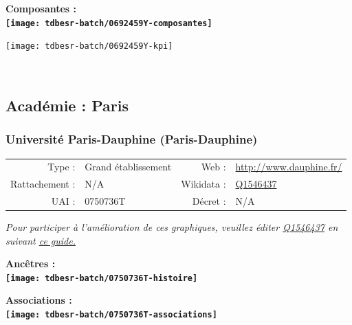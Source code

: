 \documentclass[12pt,french,]{article}
\begin{document}
\hrulefill

\begin{center} \bf Composantes : \\  
\texttt{[image: tdbesr-batch/0692459Y-composantes]} \end{center}

\begin{center}\texttt{[image: tdbesr-batch/0692459Y-kpi]} \end{center}\checkoddpage

\ifoddpage \fi ~\newpage  

\hypertarget{acaduxe9mie-paris-1}{%
\subsection{Académie : Paris}\label{acaduxe9mie-paris-1}}

\hypertarget{universituxe9-paris-dauphine-paris-dauphine}{%
\subsubsection{Université Paris-Dauphine
(Paris-Dauphine)}\label{universituxe9-paris-dauphine-paris-dauphine}}

\begin{tabular*}{\textwidth}{rp{5cm}rl}  
\hline  
Type : & Grand établissement & Web : &\href{http://www.dauphine.fr/}{http://www.dauphine.fr/} \\  
Rattachement : & N/A & Wikidata : & \href{https://www.wikidata.org/entity/Q1546437}{Q1546437} \\  
UAI : & 0750736T & Décret : & N/A \\  
\hline  
\end{tabular*}

\textit{\scriptsize Pour participer à l'amélioration de ces graphiques, veuillez éditer  \href{https://www.wikidata.org/entity/Q1546437}{Q1546437}  en suivant \href{https://github.com/cpesr/wikidataESR/blob/master/Rmd/wikidataESR.md}{ce guide.}}

\vspace{1cm}  
\begin{minipage}[b]{0.50\textwidth}\begin{center} \bf Ancêtres : \\  
\texttt{[image: tdbesr-batch/0750736T-histoire]} \end{center}\end{minipage}\begin{minipage}[b]{0.50\textwidth}\begin{center} \bf Associations : \\  
\texttt{[image: tdbesr-batch/0750736T-associations]} \end{center}\end{minipage}
\end{document}
